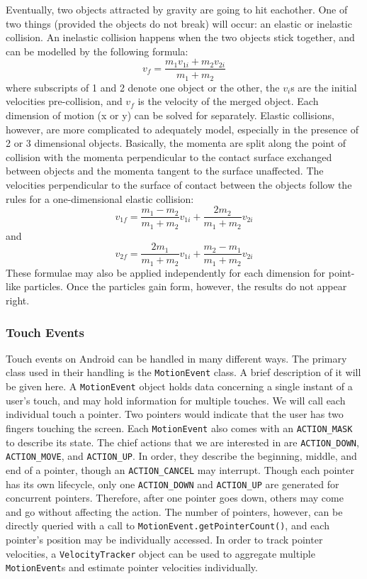 Eventually, two objects attracted by gravity are going to hit eachother.
One of two things (provided the objects do not break) will occur: an elastic or inelastic collision.
An inelastic collision happens when the two objects stick together, and can be modelled by the following formula: $$v_{f} = \frac{m_{1}v_{1i}+m_{2}v_{2i}}{m_1+m_2}$$ where subscripts of 1 and 2 denote one object or the other, the $v_i$s are the initial velocities pre-collision, and $v_{f}$ is  the velocity of the merged object.
Each dimension of motion (x or y) can be solved for separately.
Elastic collisions, however, are more complicated to adequately model, especially in the presence of 2 or 3 dimensional objects.
Basically, the momenta are split along the point of collision with the momenta perpendicular to the contact surface exchanged between objects and the momenta tangent to the surface unaffected.
The velocities perpendicular to the surface of contact between the objects follow the rules for a one-dimensional elastic collision: 
$$v_{1f} = \frac{m_{1}-m_{2}}{m_{1}+m_{2}}v_{1i}+\frac{2m_{2}}{m_{1}+m_{2}}v_{2i}$$ and
$$v_{2f} =\frac{2m_{1}}{m_{1}+m_{2}}v_{1i} +\frac{m_{2}-m_{1}}{m_{1}+m_{2}}v_{2i}$$ 
These formulae may also be applied independently for each dimension for point-like particles.
Once the particles gain form, however, the results do not appear right.

\subsubsection{Touch Events}

Touch events on Android can be handled in many different ways.
The primary class used in their handling is the \verb=MotionEvent= class.
A brief description of it will be given here.
A \verb=MotionEvent= object holds data concerning a single instant of a user's touch, and may hold information for multiple touches.
We will call each individual touch a pointer.
Two pointers would indicate that the user has two fingers touching the screen.
Each \verb=MotionEvent= also comes with an \verb=ACTION_MASK= to describe its state. 
The chief actions that we are interested in are \verb=ACTION_DOWN=, \verb=ACTION_MOVE=, and \verb=ACTION_UP=.
In order, they describe the beginning, middle, and end of a pointer, though an \verb=ACTION_CANCEL= may interrupt.
Though each pointer has its own lifecycle, only one \verb=ACTION_DOWN= and \verb=ACTION_UP= are generated for concurrent pointers.
Therefore, after one pointer goes down, others may come and go without affecting the action.
The number of pointers, however, can be directly queried with a call to \verb=MotionEvent.getPointerCount()=, and each pointer's position may be individually accessed.
In order to track pointer velocities, a \verb=VelocityTracker= object can be used to aggregate multiple \verb=MotionEvent=s and estimate pointer velocities individually.

